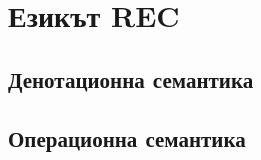 \chapter{Езикът {\bf REC}}
\label{ch:rec}



\section{Денотационна семантика}











\section{Операционна семантика}



\newpage







% 




